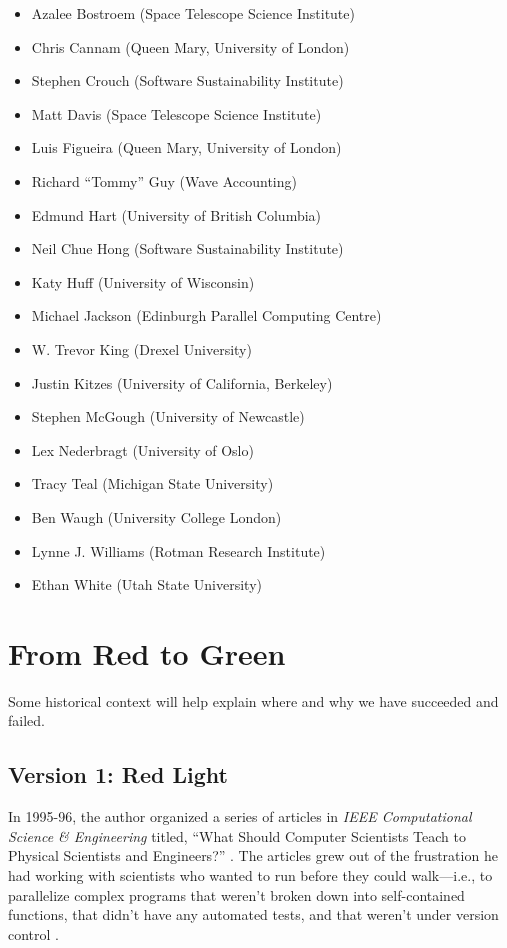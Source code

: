 \documentclass{article}
\begin{document}
\begin{itemize}
\item
  Azalee Bostroem (Space Telescope Science Institute)
\item
  Chris Cannam (Queen Mary, University of London)
\item
  Stephen Crouch (Software Sustainability Institute)
\item
  Matt Davis (Space Telescope Science Institute)
\item
  Luis Figueira (Queen Mary, University of London)
\item
  Richard ``Tommy'' Guy (Wave Accounting)
\item
  Edmund Hart (University of British Columbia)
\item
  Neil Chue Hong (Software Sustainability Institute)
\item
  Katy Huff (University of Wisconsin)
\item
  Michael Jackson (Edinburgh Parallel Computing Centre)
\item
  W. Trevor King (Drexel University)
\item
  Justin Kitzes (University of California, Berkeley)
\item
  Stephen McGough (University of Newcastle)
\item
  Lex Nederbragt (University of Oslo)
\item
  Tracy Teal (Michigan State University)
\item
  Ben Waugh (University College London)
\item
  Lynne J. Williams (Rotman Research Institute)
\item
  Ethan White (Utah State University)
\end{itemize}

\section{From Red to Green}

Some historical context will help explain where and why we have
succeeded and failed.

\subsection{Version 1: Red Light}

In 1995-96, the author organized a series of articles in \emph{IEEE
Computational Science \& Engineering} titled, ``What Should Computer
Scientists Teach to Physical Scientists and Engineers?'' \cite{wilson1996}.
The articles grew out of the frustration he had working with scientists
who wanted to run before they could walk---i.e., to parallelize complex
programs that weren't broken down into self-contained functions, that
didn't have any automated tests, and that weren't under version control
\cite{wilson2006a}.
\end{document}
